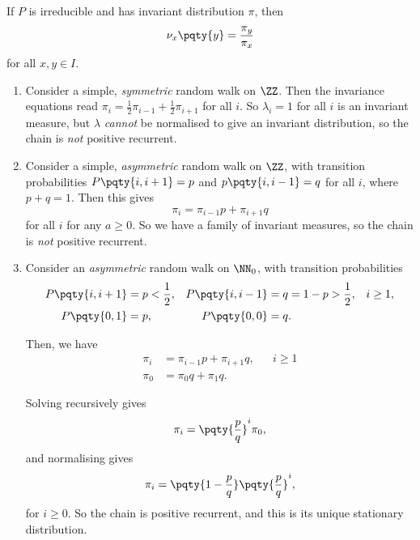 \begin{corollary}
    If \(P\) is irreducible and has invariant distribution \(\pi\), then
    \[
        \nu_x \pqty{y} = \frac{\pi_y}{\pi_x}
    \]
    for all \(x, y \in I\).
\end{corollary}

\begin{examples}
    \begin{enumerate}
        \item Consider a simple, \emph{symmetric} random walk on \(\ZZ\). Then the invariance equations read \(\pi_i = \frac{1}{2} \pi_{i - 1} + \frac{1}{2} \pi_{i + 1}\) for all \(i\).
        So \(\lambda_i = 1\) for all \(i\) is an invariant measure, but \(\lambda\) \emph{cannot} be normalised to give an invariant distribution, so the chain is \emph{not} positive recurrent.
        
        \item Consider a simple, \emph{asymmetric} random walk on \(\ZZ\), with transition probabilities \(P\pqty{i, i + 1} = p\) and \(p\pqty{i, i - 1} = q\) for all \(i\), where \(p + q = 1\). Then this gives
        \[
            \pi_i = \pi_{i - 1} p + \pi_{i + 1} q
        \]
        for all \(i\) for any \(a \geq 0\). So we have a family of invariant measures, so the chain is \emph{not} positive recurrent.

        \item Consider an \emph{asymmetric} random walk on \(\NN_0\), with transition probabilities
        \begin{align*}
            P\pqty{i, i + 1} &= p < \frac{1}{2}, & P\pqty{i, i - 1} &= q = 1 - p > \frac{1}{2}, && i \geq 1, \\
            P\pqty{0, 1} &= p, & P\pqty{0, 0} &= q.
        \end{align*}

        Then, we have
        \begin{align*}
            \pi_i &= \pi_{i - 1} p + \pi_{i + 1} q, && i \geq 1 \\
            \pi_0 &= \pi_0 q + \pi_1 q.
        \end{align*}

        Solving recursively gives
        \[
            \pi_i = \pqty{\frac{p}{q}}^i \pi_0,
        \]
        and normalising gives
        \[
            \pi_i = \pqty{1 - \frac{p}{q}} \pqty{\frac{p}{q}}^i,
        \]
        for \(i \geq 0\). So the chain is positive recurrent, and this is its unique stationary distribution.
    \end{enumerate}
\end{examples}